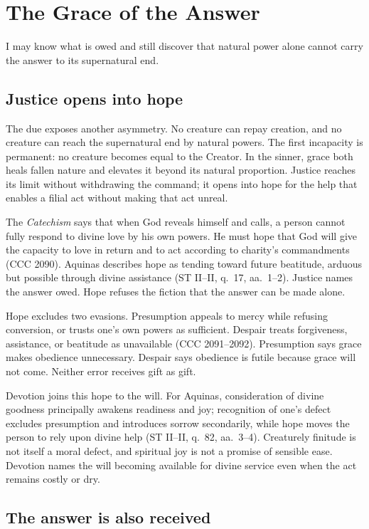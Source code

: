 \section{The Grace of the Answer}

I may know what is owed and still discover that natural power alone cannot carry the answer to its supernatural end.

\subsection{Justice opens into hope}

The due exposes another asymmetry. No creature can repay creation, and no creature can reach the supernatural end by natural powers. The first incapacity is permanent: no creature becomes equal to the Creator. In the sinner, grace both heals fallen nature and elevates it beyond its natural proportion. Justice reaches its limit without withdrawing the command; it opens into hope for the help that enables a filial act without making that act unreal.

The \emph{Catechism} says that when God reveals himself and calls, a person cannot fully respond to divine love by his own powers. He must hope that God will give the capacity to love in return and to act according to charity's commandments (CCC 2090). Aquinas describes hope as tending toward future beatitude, arduous but possible through divine assistance (ST II--II, q.~17, aa.~1--2). Justice names the answer owed. Hope refuses the fiction that the answer can be made alone.

Hope excludes two evasions. Presumption appeals to mercy while refusing conversion, or trusts one's own powers as sufficient. Despair treats forgiveness, assistance, or beatitude as unavailable (CCC 2091--2092). Presumption says grace makes obedience unnecessary. Despair says obedience is futile because grace will not come. Neither error receives gift as gift.

Devotion joins this hope to the will. For Aquinas, consideration of divine goodness principally awakens readiness and joy; recognition of one's defect excludes presumption and introduces sorrow secondarily, while hope moves the person to rely upon divine help (ST II--II, q.~82, aa.~3--4). Creaturely finitude is not itself a moral defect, and spiritual joy is not a promise of sensible ease. Devotion names the will becoming available for divine service even when the act remains costly or dry.

\subsection{The answer is also received}

